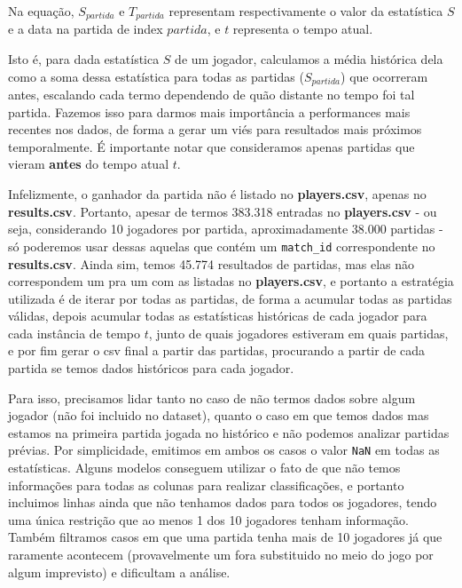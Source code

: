 \documentclass[12pt]{article}
\begin{document}
Na equação, $S_{partida}$ e $T_{partida}$ representam respectivamente o valor da estatística $S$ e a data na partida de index $partida$, e $t$ representa o tempo atual.

Isto é, para dada estatística $S$ de um jogador, calculamos a média histórica dela como a soma dessa estatística para todas as partidas ($S_{partida}$) que ocorreram antes, escalando cada termo dependendo de quão distante no tempo foi tal partida. Fazemos isso para darmos mais importância a performances mais recentes nos dados, de forma a gerar um viés para resultados mais próximos temporalmente. É importante notar que consideramos apenas partidas que vieram \textbf{antes} do tempo atual $t$.

Infelizmente, o ganhador da partida não é listado no \textbf{players.csv}, apenas no \textbf{results.csv}. Portanto, apesar de termos 383.318 entradas no \textbf{players.csv} - ou seja, considerando 10 jogadores por partida, aproximadamente 38.000 partidas - só poderemos usar dessas aquelas que contém um \verb+match_id+ correspondente no \textbf{results.csv}. Ainda sim, temos 45.774 resultados de partidas, mas elas não correspondem um pra um com as listadas no \textbf{players.csv}, e portanto a estratégia utilizada é de iterar por todas as partidas, de forma a acumular todas as partidas válidas, depois acumular todas as estatísticas históricas de cada jogador para cada instância de tempo $t$, junto de quais jogadores estiveram em quais partidas, e por fim gerar o csv final a partir das partidas, procurando a partir de cada partida se temos dados históricos para cada jogador.

Para isso, precisamos lidar tanto no caso de não termos dados sobre algum jogador (não foi incluido no dataset), quanto o caso em que temos dados mas estamos na primeira partida jogada no histórico e não podemos analizar partidas prévias. Por simplicidade, emitimos em ambos os casos o valor \verb+NaN+ em todas as estatísticas. Alguns modelos conseguem utilizar o fato de que não temos informações para todas as colunas para realizar classificações, e portanto incluimos linhas ainda que não tenhamos dados para todos os jogadores, tendo uma única restrição que ao menos 1 dos 10 jogadores tenham informação. Também filtramos casos em que uma partida tenha mais de 10 jogadores já que raramente acontecem (provavelmente um fora substituido no meio do jogo por algum imprevisto) e dificultam a análise.
\end{document}
